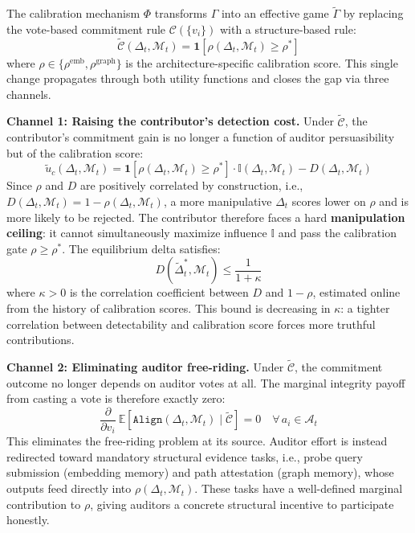 The calibration mechanism $\Phi$ transforms $\Gamma$ into an effective
game $\tilde{\Gamma}$ by replacing the vote-based commitment rule
$\mathcal{C}(\{v_i\})$ with a structure-based rule:
\begin{equation}
    \tilde{\mathcal{C}}(\Delta_t, \mathcal{M}_t) =
    \mathbf{1}\!\left[
        \rho(\Delta_t, \mathcal{M}_t) \geq \rho^*
    \right]
    \label{eq:cali-commit-rule}
\end{equation}
where $\rho \in \{\rho^{\text{emb}}, \rho^{\text{graph}}\}$ is the
architecture-specific calibration score. This single change propagates
through both utility functions and closes the gap via three channels.

\textbf{Channel 1: Raising the contributor's detection cost.}
Under $\tilde{\mathcal{C}}$, the contributor's commitment gain is no
longer a function of auditor persuasibility but of the calibration
score:
\begin{equation}
    \tilde{u}_c(\Delta_t, \mathcal{M}_t) =
    \mathbf{1}\!\left[\rho(\Delta_t, \mathcal{M}_t) \geq \rho^*\right]
    \cdot \mathbb{I}(\Delta_t, \mathcal{M}_t)
    - D(\Delta_t, \mathcal{M}_t)
\end{equation}
Since $\rho$ and $D$ are positively correlated by construction, i.e., $D(\Delta_t, \mathcal{M}_t) = 1 - \rho(\Delta_t, \mathcal{M}_t)$, a more manipulative
$\Delta_t$ scores lower on $\rho$ and is more likely to be rejected.
The contributor therefore faces a hard \textbf{manipulation ceiling}:
it cannot simultaneously maximize influence $\mathbb{I}$ and pass the
calibration gate $\rho \geq \rho^*$. The equilibrium delta satisfies:
\begin{equation}
    D(\tilde{\Delta}_t^*, \mathcal{M}_t) \leq
    \frac{1}{1 + \kappa}
    \label{eq:manip_bound}
\end{equation}
where $\kappa > 0$ is the correlation coefficient between $D$ and
$1 - \rho$, estimated online from the history of calibration scores.
This bound is decreasing in $\kappa$: a tighter correlation between
detectability and calibration score forces more truthful contributions.

\textbf{Channel 2: Eliminating auditor free-riding.}
Under $\tilde{\mathcal{C}}$, the commitment outcome no longer depends
on auditor votes at all. The marginal integrity payoff from casting a
vote is therefore exactly zero:
\begin{equation}
    \frac{\partial}{\partial v_i}\
    \mathbb{E}\!\left[
        \texttt{Align}(\Delta_t, \mathcal{M}_t) \mid \tilde{\mathcal{C}}
    \right] = 0
    \quad \forall\, a_i \in \mathcal{A}_t
\end{equation}
This eliminates the free-riding problem at its source. Auditor effort
is instead redirected toward mandatory structural evidence tasks, i.e.,
probe query submission (embedding memory) and path attestation (graph
memory), whose outputs feed directly into $\rho(\Delta_t,
\mathcal{M}_t)$. These tasks have a well-defined marginal contribution
to $\rho$, giving auditors a concrete structural incentive to
participate honestly.

